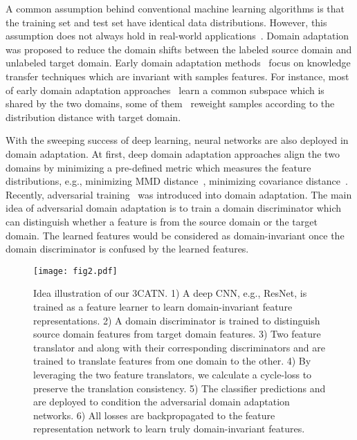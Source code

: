 \documentclass[sigconf]{acmart}
\begin{document}
A common assumption behind conventional machine learning algorithms is that the training set and test set have identical data distributions. However, this assumption does not always hold in real-world applications~\cite{pan2010survey,visda2017}. Domain adaptation~\cite{pinheiro2018unsupervised,taigman2016unsupervised} was proposed to reduce the domain shifts between the labeled source domain and unlabeled target domain. Early domain adaptation methods~\cite{pan2011domain,gong2012geodesic,aljundi2015landmarks} focus on knowledge transfer techniques which are invariant with samples features. For instance, most of early domain adaptation approaches~\cite{pan2011domain,gong2012geodesic,ding2014latent} learn a common subspace which is shared by the two domains, some of them~\cite{aljundi2015landmarks,hubert2016learning} reweight samples according to the distribution distance with target domain.

With the sweeping success of deep learning, neural networks are also deployed in domain adaptation. At first, deep domain adaptation approaches align the two domains by minimizing a pre-defined metric which measures the feature distributions, e.g., minimizing MMD distance~\cite{long2017deep}, minimizing covariance distance~\cite{sun2016deep}. Recently, adversarial training~\cite{tzeng2017adversarial,ganin2016domain,long2018conditional} was introduced into domain adaptation. The main idea of adversarial domain adaptation is to train a domain discriminator which can distinguish whether a feature is from the source domain or the target domain. The learned features would be considered as domain-invariant once the domain discriminator is confused by the learned features. 

\begin{figure*}[t]
\begin{center}
\texttt{[image: fig2.pdf]}
\end{center}
\vspace{-10pt}
\caption{Idea illustration of our 3CATN. 1) A deep CNN, e.g., ResNet, is trained as a feature learner to learn domain-invariant feature representations. 2) A domain discriminator  is trained to distinguish source domain features from target domain features. 3) Two feature translator  and  along with their corresponding discriminators  and  are trained to translate features from one domain to the other. 4) By leveraging the two feature translators, we calculate a cycle-loss to preserve the translation consistency. 5) The classifier predictions  and  are deployed to condition the adversarial domain adaptation networks. 6) All losses are backpropagated to the feature representation network to learn truly domain-invariant features.}
\label{fig:ideaill}
\end{figure*}  
\end{document}
